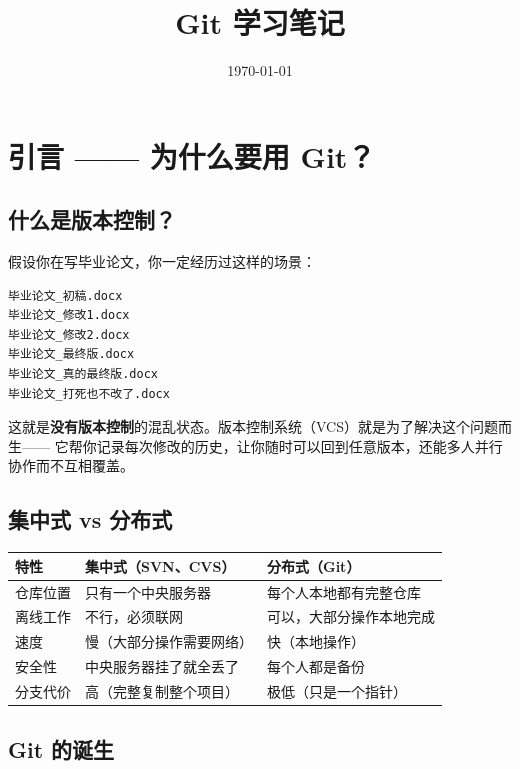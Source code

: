 \documentclass[12pt,a4paper]{article}
\title{\huge \textbf{Git 学习笔记}}
\author{}
\date{\today}
\begin{document}
\maketitle
\thispagestyle{empty}
\newpage

\tableofcontents
\newpage

\section{引言 —— 为什么要用 Git？}

\subsection{什么是版本控制？}

假设你在写毕业论文，你一定经历过这样的场景：

\begin{lstlisting}[frame=none, numbers=none]
毕业论文_初稿.docx
毕业论文_修改1.docx
毕业论文_修改2.docx
毕业论文_最终版.docx
毕业论文_真的最终版.docx
毕业论文_打死也不改了.docx
\end{lstlisting}

这就是\textbf{没有版本控制}的混乱状态。版本控制系统（VCS）就是为了解决这个问题而生——
它帮你记录每次修改的历史，让你随时可以回到任意版本，还能多人并行协作而不互相覆盖。

\subsection{集中式 vs 分布式}

\begin{longtable}{|p{4cm}|p{5cm}|p{5cm}|}
\hline
\textbf{特性} & \textbf{集中式（SVN、CVS）} & \textbf{分布式（Git）} \\
\hline
仓库位置 & 只有一个中央服务器 & 每个人本地都有完整仓库 \\
\hline
离线工作 & 不行，必须联网 & 可以，大部分操作本地完成 \\
\hline
速度 & 慢（大部分操作需要网络） & 快（本地操作） \\
\hline
安全性 & 中央服务器挂了就全丢了 & 每个人都是备份 \\
\hline
分支代价 & 高（完整复制整个项目） & 极低（只是一个指针） \\
\hline
\end{longtable}

\subsection{Git 的诞生}
\end{document}
